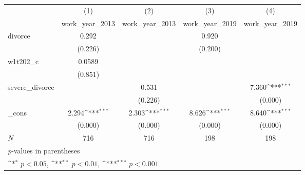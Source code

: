 {
\def\sym#1{\ifmmode^{#1}\else\(^{#1}\)\fi}
\begin{tabular}{l*{4}{c}}
\hline\hline
            &\multicolumn{1}{c}{(1)}&\multicolumn{1}{c}{(2)}&\multicolumn{1}{c}{(3)}&\multicolumn{1}{c}{(4)}\\
            &\multicolumn{1}{c}{work\_year\_2013}&\multicolumn{1}{c}{work\_year\_2013}&\multicolumn{1}{c}{work\_year\_2019}&\multicolumn{1}{c}{work\_year\_2019}\\
\hline
divorce     &       0.292         &                     &       0.920         &                     \\
            &     (0.226)         &                     &     (0.200)         &                     \\
[1em]
w1t202\_c    &      0.0589         &                     &                     &                     \\
            &     (0.851)         &                     &                     &                     \\
[1em]
severe\_divorce&                     &       0.531         &                     &       7.360\sym{***}\\
            &                     &     (0.226)         &                     &     (0.000)         \\
[1em]
\_cons      &       2.294\sym{***}&       2.303\sym{***}&       8.626\sym{***}&       8.640\sym{***}\\
            &     (0.000)         &     (0.000)         &     (0.000)         &     (0.000)         \\
\hline
\(N\)       &         716         &         716         &         198         &         198         \\
\hline\hline
\multicolumn{5}{l}{\footnotesize \textit{p}-values in parentheses}\\
\multicolumn{5}{l}{\footnotesize \sym{*} \(p<0.05\), \sym{**} \(p<0.01\), \sym{***} \(p<0.001\)}\\
\end{tabular}
}
